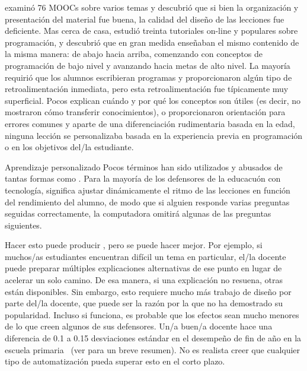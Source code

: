 \cite{Marg2015} examinó 76 MOOCs sobre varios temas y descubrió que
si bien la organización y presentación del material fue buena,
la calidad del diseño de las lecciones fue deficiente.
Mas cerca de casa,
\cite{Kim2017} estudió treinta tutoriales on-line y populares sobre programación,
y descubrió que en gran medida enseñaban el mismo contenido de la misma manera:
de abajo hacia arriba,
comenzando con conceptos de programación de bajo nivel y avanzando hacia metas de alto nivel.
La mayoría requirió que los alumnos escribieran programas y proporcionaron algún tipo de retroalimentación inmediata,
pero esta retroalimentación fue típicamente muy superficial.
Pocos explican cuándo y por qué los conceptos son útiles
(es decir, no mostraron cómo transferir conocimientos),
o proporcionaron orientación para errores comunes
y aparte de una diferenciación rudimentaria basada en la edad,
ninguna lección se personalizaba basada en la experiencia previa en programación o en los objetivos del/la estudiante.

\begin{aside}{Aprendizaje personalizado}
  Pocos términos han sido utilizados y abusados ​​de tantas formas 
  como .
  Para la mayoría de los defensores de la educacuón con tecnología,
  significa ajustar dinámicamente el ritmo de las lecciones en función del rendimiento del alumno,
  de modo que si alguien responde varias preguntas seguidas correctamente,
  la computadora omitirá algunas de las preguntas siguientes.

  Hacer esto puede producir
  ,
  pero se puede hacer mejor.
  Por ejemplo,
  si muchos/as estudiantes encuentran difícil un tema en particular,
  el/la docente puede preparar múltiples explicaciones alternativas de ese punto
  en lugar de acelerar un solo camino.
  De esa manera,
  si una explicación no resuena,
  otras están disponibles.
  Sin embargo,
  esto requiere mucho más trabajo de diseño por parte del/la docente,
  que puede ser la razón por la que no ha demostrado su popularidad.
  Incluso si funciona,
  es probable que los efectos sean mucho menores de lo que creen algunos de sus defensores.
  Un/a buen/a docente hace una diferencia de 0.1 a 0.15 desviaciones estándar en el desempeño de fin de año en la escuela primaria~\cite{Chet2014}
  (ver  para un breve resumen).
  No es realista creer que cualquier tipo de automatización pueda superar esto en el corto plazo.
\end{aside}

